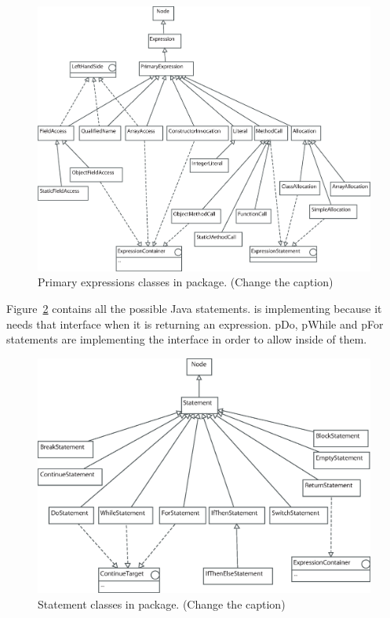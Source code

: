 \begin{figure}[!htb]
\begin{center}
\includegraphics[width=\textwidth]{images/primaryexpressions.eps}
\caption{Primary expressions classes in  package. (Change the caption)}
\label{fig:primary_expression_classes}
\end{center}
\end{figure}

Figure~\ref{fig:statement_classes} contains all the possible Java
statements.  is implementing
 because it needs that interface when it is
returning an expression. p{Do}, p{While} and p{For} statements are
implementing the  interface in order to allow
 inside of them.


\begin{figure}[!htb]
\begin{center}
\includegraphics[width=\textwidth]{images/statements.eps}
\caption{Statement classes in  package. (Change the caption)}
\label{fig:statement_classes}
\end{center}
\end{figure}

